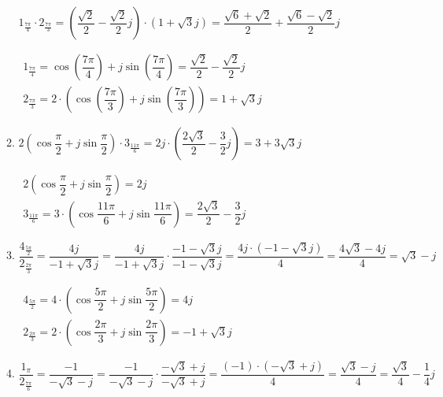 \begin{enumerate}[label=\color{red}\textbf{\arabic*)}]
\begin{enumerate}[label=\color{red}\textbf{\textbf{\textbf{\alph*)}}}]
                $1_{\frac{7\pi}{4} }\cdot 2_{\frac{7\pi}{3} }=\left( \dfrac{\sqrt{2} }{2}-\dfrac{\sqrt{2} }{2}j \right) \cdot (1+\sqrt{3} j)=\dfrac{\sqrt{6} +\sqrt{2} }{2}+\dfrac{\sqrt{6} -\sqrt{2} }{2}j$

                $\begin{array}{l}
                    1_{\frac{7\pi}{4} }=\cos\left( \dfrac{7\pi}{4} \right) + j\sin\left( \dfrac{7\pi}{4} \right) =\dfrac{\sqrt{2} }{2}-\dfrac{\sqrt{2} }{2}j\\
                    2_{\frac{7\pi}{3} }=2\cdot \left( \cos\left( \dfrac{7\pi}{3} \right) +j\sin\left( \dfrac{7\pi}{3} \right)  \right) =1+\sqrt{3} j
                \end{array}$
            \item {} 

                $2\left( \cos\dfrac{\pi}{2} +j\sin\dfrac{\pi}{2}  \right) \cdot 3_{\frac{11\pi}{6} } =2j\cdot \left( \dfrac{2\sqrt{3} }{2}-\dfrac{3}{2}j \right) =3+3\sqrt{3} j$

                $\begin{array}{l}
                2\left( \cos\dfrac{\pi}{2} +j\sin\dfrac{\pi}{2}  \right) =2j\\
                3_{\frac{11\pi}{6} }=3\cdot \left( \cos \dfrac{11\pi}{6}+j\sin \dfrac{11\pi}{6} \right) =\dfrac{2\sqrt{3} }{2}-\dfrac{3}{2}j
                \end{array}$

            \item {} 

                $\dfrac{4_{\frac{5\pi}{2} }}{2_{\frac{2\pi}{3} }}=\dfrac{4j}{-1+\sqrt{3}j }=\dfrac{4j}{-1+\sqrt{3}j }\cdot \dfrac{-1-\sqrt{3}j }{-1-\sqrt{3} j}=\dfrac{4j\cdot (-1-\sqrt{3}j) }{4}=\dfrac{4\sqrt{3} -4j}{4}=\sqrt{3}-j $

                $\begin{array}{l}
                    4_{\frac{5\pi}{2} }=4\cdot \left( \cos \dfrac{5\pi}{2}+j\sin \dfrac{5\pi}{2} \right) = 4j\\
                    2_{\frac{2\pi}{3} }=2\cdot \left( \cos \dfrac{2\pi}{3}+j\sin \dfrac{2\pi}{3} \right) = -1+\sqrt{3}j 
                \end{array}$
            \item {} 

                $\dfrac{1_{\pi}}{2_{\frac{7\pi}{6} }}= \dfrac{-1}{-\sqrt{3} -j}=\dfrac{-1}{-\sqrt{3}-j }\cdot \dfrac{-\sqrt{3}+j }{-\sqrt{3} +j}=\dfrac{(-1)\cdot (-\sqrt{3}+j) }{4}=\dfrac{\sqrt{3}-j }{4}=\dfrac{\sqrt{3} }{4}-\dfrac{1}{4}j$ 


\end{enumerate}
\end{enumerate}
